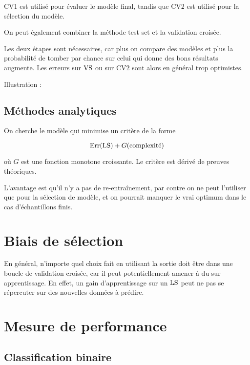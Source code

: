 	
	CV1 est utilisé pour évaluer le modèle final, tandis que CV2 est utilisé pour la sélection du modèle.
	
	On peut également combiner la méthode test set et la validation croisée.
	
	
	Les deux étapes sont nécessaires, car plus on compare des modèles et plus la probabilité de tomber par chance sur celui qui donne des bons résultats augmente. Les erreurs sur $\text{VS}$ ou sur CV2 sont alors en général trop optimistes.
	
	Illustration :
	
	
	\subsection{Méthodes analytiques}
	
	On cherche le modèle qui minimise un critère de la forme
	
	$$\text{Err}(\text{LS}) + G(\text{complexité})$$
	
	où $G$ est une fonction monotone croissante. Le critère est dérivé de preuves théoriques.
	
	L'avantage est qu'il n'y a pas de re-entraînement, par contre on ne peut l'utiliser que pour la sélection de modèle, et on pourrait manquer le vrai optimum dans le cas d'échantillons finis.
	
\section{Biais de sélection}
	
	En général, n'importe quel choix fait en utilisant la sortie doit être dans une boucle de validation croisée, car il peut potentiellement amener à du sur-apprentissage. En effet, un gain d'apprentissage sur un $\text{LS}$ peut ne pas se répercuter sur des nouvelles données à prédire.
	
		
\section{Mesure de performance}

	\subsection{Classification binaire}
	
